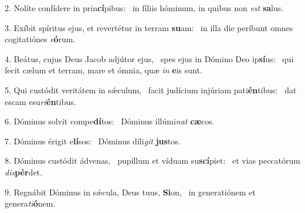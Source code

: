 2. Nolíte confídere in prin\textbf{cí}pibus: \ast\  in fíliis hóminum, in quibus non \textit{est} \textbf{sa}lus.\

3. Exíbit spíritus ejus, et revertétur in terram \textbf{su}am: \ast\  in illa die períbunt omnes cogitatiónes \textit{e}\textbf{ó}rum.\

4. Beátus, cujus Deus Jacob adjútor ejus, \dag\  spes ejus in Dómino Deo ip\textbf{sí}us: \ast\  qui fecit cælum et terram, mare et ómnia, quæ \textit{in} \textbf{e}is sunt.\

5. Qui custódit veritátem in sǽculum, \dag\  facit judícium injúriam pati\textbf{én}tibus: \ast\  dat escam esu\textit{ri}\textbf{én}tibus.\

6. Dóminus solvit compe\textbf{dí}tos: \ast\  Dóminus illúmi\textit{nat} \textbf{cæ}cos.\

7. Dóminus érigit e\textbf{lí}sos: \ast\  Dóminus díli\textit{git} \textbf{jus}tos.\

8. Dóminus custódit ádvenas, \dag\  pupíllum et víduam su\textbf{scí}piet: \ast\  et vias peccatórum \textit{dis}\textbf{pér}det.\

9. Regnábit Dóminus in sǽcula, Deus tuus, \textbf{Si}on, \ast\  in generatiónem et genera\textit{ti}\textbf{ó}nem.\

